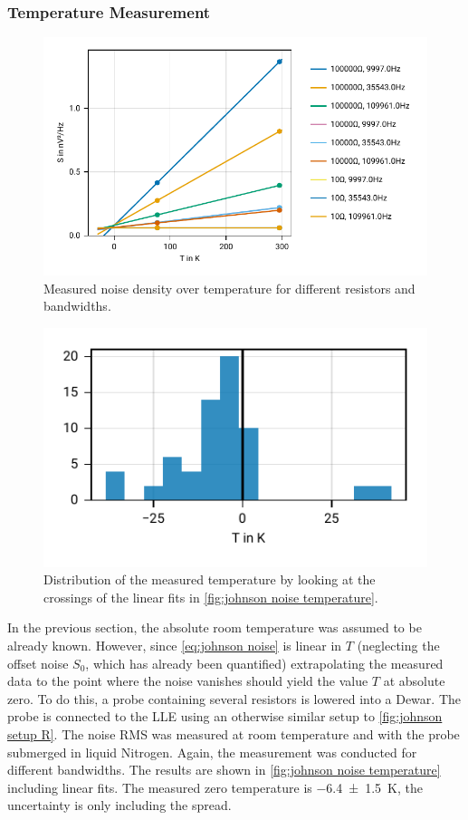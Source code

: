 \documentclass[
    parskip=half, 
    twoside=false,
    twocolumn=true,
    fontsize=11pt,
]{scrarticle}
\begin{document}
\subsubsection*{Temperature Measurement}
\begin{figure}[h!]
    \centering
    \includegraphics{figures/02 temperature.pdf}
    \caption{
        Measured noise density over temperature for different resistors and bandwidths.
    }
    \label{fig:johnson noise temperature}
\end{figure}
\begin{figure}[h!]
    \centering
    \includegraphics{figures/02 temperature distribution.pdf}
    \caption{
        Distribution of the measured temperature by looking at the crossings of the linear fits in \autoref{fig:johnson noise temperature}.
    }
    \label{fig:johnson noise temperature distribution}
\end{figure}
In the previous section, the absolute room temperature was assumed to be already known. However, since \autoref{eq:johnson noise} is linear in $T$ (neglecting the offset noise $S_0$, which has already been quantified) extrapolating the measured data to the point where the noise vanishes should yield the value $T$ at absolute zero. To do this, a probe containing several resistors is lowered into a Dewar. The probe is connected to the LLE using an otherwise similar setup to \autoref{fig:johnson setup R}. The noise RMS was measured at room temperature and with the probe submerged in liquid Nitrogen. Again, the measurement was conducted for different bandwidths. The results are shown in \autoref{fig:johnson noise temperature} including linear fits.
The measured zero temperature is \SI{-6.4(15)}{K}, the uncertainty is only including the spread.
\end{document}
